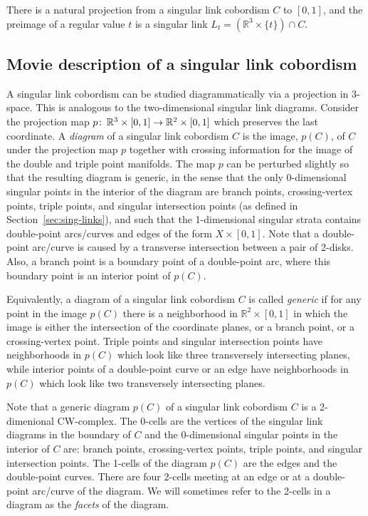 \documentclass{amsart}\usepackage{amsfonts, amsmath, amssymb}\usepackage{graphicx, epic, epsf, enumerate, stmaryrd}
\theoremstyle{definition}
\numberwithin{equation}{section}
\begin{document}
There is a natural projection from a singular link cobordism $C$ to $[0, 1]$, and the preimage of a regular value $t$ is a singular link $L_t = ({\mathbb{R}}^3 \times \{ t \}) \cap C$.

\subsection{Movie description of a singular link cobordism}
A singular link cobordism can be studied diagrammatically via a projection in $3$-space. This is analogous to the two-dimensional singular link diagrams. Consider the projection map $p {\colon\thinspace} {\mathbb{R}}^3 \times [0, 1] \to {\mathbb{R}}^2 \times [0, 1]$ which preserves the last coordinate. A \textit{diagram} of a singular link cobordism $C$  is the image, $p(C)$, of $C$ under the projection map $p$ together with crossing information for the image of the double and triple point manifolds. The map $p$ can be perturbed slightly so that the resulting diagram is generic, in the sense that the only 0-dimensional singular points in the interior of the diagram are branch points, crossing-vertex points, triple points, and singular intersection points (as defined in Section~\ref{sec:sing-links}), and such that the 1-dimensional singular strata contains double-point arcs/curves and edges of the form $X \times [0, 1]$. Note that a double-point arc/curve is caused by a transverse intersection between a pair of 2-disks. Also, a branch point is a boundary point of a double-point arc, where this boundary point is an interior point of $p(C)$.

Equivalently, a diagram of a singular link cobordism $C$ is called \textit{generic} if for any point in the image $p(C)$ there is a neighborhood in ${\mathbb{R}}^2 \times [0, 1]$ in which the image is either the intersection of the coordinate planes, or a branch point, or a crossing-vertex point.
Triple points and singular intersection points have neighborhoods in $p(C)$ which look like three transversely intersecting planes, while interior points of a double-point curve or an edge have  
neighborhoods in $p(C)$ which look like two transversely intersecting planes. 

Note that a generic diagram $p(C)$ of a singular link cobordism $C$ is a 2-dimenional CW-complex. The 0-cells are the vertices of the singular link diagrams in the boundary of $C$ and the 0-dimensional singular points in the interior of $C$ are: branch points, crossing-vertex points, triple points, and singular intersection points. The 1-cells of the diagram $p(C)$ are the edges and the double-point curves. There are four 2-cells meeting at an edge or at a double-point arc/curve of the diagram. We will sometimes refer to the 2-cells in a diagram as the \textit{facets} of the diagram.
\end{document}
